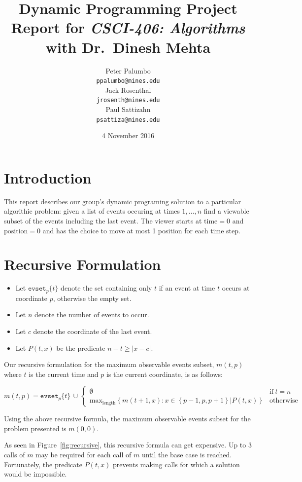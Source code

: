 \documentclass[titlepage,12pt]{article}
\title{\textbf{Dynamic Programming Project} \\ {\small Report for \emph{CSCI-406:
Algorithms} with Dr.~Dinesh Mehta}}
\author{%
    Peter Palumbo \\ {\small\texttt{ppalumbo@mines.edu}} \\[12pt]
    Jack Rosenthal \\ {\small\texttt{jrosenth@mines.edu}} \\[12pt]
    Paul Sattizahn \\ {\small\texttt{psattiza@mines.edu}} \\
}
\date{4 November 2016}
\let\ge=\geqslant
\begin{document}
\maketitle
\section{Introduction}

This report describes our group's dynamic programing solution to a particular
algorithic problem: given a list of events occuring at times $1,\ldots,n$ find
a viewable subset of the events including the last event. The viewer starts at
$\text{time}=0$ and $\text{position}=0$ and has the choice to move at most 1
position for each time step.

\section{Recursive Formulation}

\begin{itemize}
    \item Let $\mathtt{evset}_p\{t\}$ denote the set containing only $t$ if an event
        at time $t$ occurs at coordinate $p$, otherwise the empty set.
    \item Let $n$ denote the number of events to occur.
    \item Let $c$ denote the coordinate of the last event.
    \item Let $P(t, x)$ be the predicate $n - t \ge |x - c|$.
\end{itemize}

Our recursive formulation for the maximum observable events subset, $m(t, p)$
where $t$ is the current time and $p$ is the current coordinate, is as
follows:

\begin{displaymath}
    m(t, p) = \mathtt{evset}_p\{t\}\, \cup\,
    \begin{cases}
        \emptyset & \text{if}\ t = n \\
        \text{max}_{\text{length}} \left\{m(t + 1, x) :
        x \in \left\{p - 1, p, p + 1\right\} | P(t, x)
        \right\} & \text{otherwise}
    \end{cases}
\end{displaymath}

Using the above recursive formula, the maximum observable events subset for the
problem presented is $m(0, 0)$.

As seen in Figure~\ref{fig:recursive}, this recursive formula can get
expensive. Up to 3 calls of $m$ may be required for each call of $m$ until the
base case is reached. Fortunately, the predicate $P(t, x)$ prevents making
calls for which a solution would be impossible.
\end{document}
